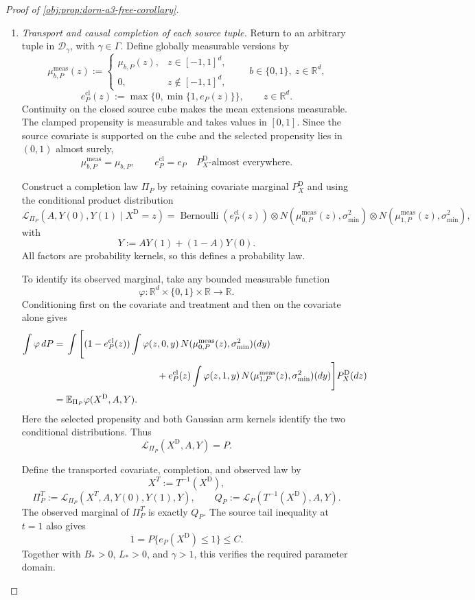 \documentclass[11pt]{article}
\begin{document}
\begin{proof}[Proof of \cref{obj:prop:dorn-a3-free-corollary}]
\begin{enumerate}
\item \emph{Transport and causal completion of each source tuple.}
Return to an arbitrary tuple in \(\mathcal D_\gamma\), with \(\gamma\in\Gamma\). Define globally measurable versions by
\[
\mu_{b,P}^{\mathrm{meas}}(z):=
\begin{cases}
\mu_{b,P}(z),&z\in[-1,1]^d,\\
0,&z\notin[-1,1]^d,
\end{cases}
\qquad
b\in\{0,1\},\ z\in\mathbb R^d,
\]
\[
e_P^{\mathrm{cl}}(z):=
\max\{0,\min\{1,e_P(z)\}\},
\qquad z\in\mathbb R^d.
\]
Continuity on the closed source cube makes the mean extensions measurable. The clamped propensity is measurable and takes values in \([0,1]\). Since the source covariate is supported on the cube and the selected propensity lies in \((0,1)\) almost surely,
\[
\mu_{b,P}^{\mathrm{meas}}=\mu_{b,P},
\qquad
e_P^{\mathrm{cl}}=e_P
\quad P_X^{\mathrm D}\text{-almost everywhere}.
\]

Construct a completion law \(\Pi_P\) by retaining covariate marginal
\(P_X^{\mathrm D}\) and using the conditional product distribution
\[
\mathcal L_{\Pi_P}(A,Y(0),Y(1)\mid X^{\mathrm D}=z)
=
\operatorname{Bernoulli}(e_P^{\mathrm{cl}}(z))
\otimes
N(\mu_{0,P}^{\mathrm{meas}}(z),\sigma_{\min}^2)
\otimes
N(\mu_{1,P}^{\mathrm{meas}}(z),\sigma_{\min}^2),
\]
with
\[
Y:=AY(1)+(1-A)Y(0).
\]
All factors are probability kernels, so this defines a probability law.

To identify its observed marginal, take any bounded measurable function
\[
\varphi:\mathbb R^d\times\{0,1\}\times\mathbb R\longrightarrow\mathbb R.
\]
Conditioning first on the covariate and treatment and then on the covariate alone gives
\[
\begin{aligned}
\int \varphi\,dP
={}&
\int\Bigg[
(1-e_P^{\mathrm{cl}}(z))
\int\varphi(z,0,y)\,
N(\mu_{0,P}^{\mathrm{meas}}(z),\sigma_{\min}^2)(dy)
\\
&\hspace{34mm}
+
e_P^{\mathrm{cl}}(z)
\int\varphi(z,1,y)\,
N(\mu_{1,P}^{\mathrm{meas}}(z),\sigma_{\min}^2)(dy)
\Bigg]P_X^{\mathrm D}(dz)
\\
={}&
\mathbb E_{\Pi_P}\varphi(X^{\mathrm D},A,Y).
\end{aligned}
\]
Here the selected propensity and both Gaussian arm kernels identify the two conditional distributions. Thus
\[
\mathcal L_{\Pi_P}(X^{\mathrm D},A,Y)=P.
\]

Define the transported covariate, completion, and observed law by
\[
X^T:=T^{-1}(X^{\mathrm D}),
\]
\[
\Pi_P^T:=
\mathcal L_{\Pi_P}(X^T,A,Y(0),Y(1),Y),
\qquad
Q_P:=
\mathcal L_P(T^{-1}(X^{\mathrm D}),A,Y).
\]
The observed marginal of \(\Pi_P^T\) is exactly \(Q_P\). The source tail inequality at \(t=1\) also gives
\[
1=P\{e_P(X^{\mathrm D})\le1\}\le C.
\]
Together with \(B_*>0\), \(L_*>0\), and \(\gamma>1\), this verifies the required parameter domain.


\end{enumerate}
\end{proof}
\end{document}
